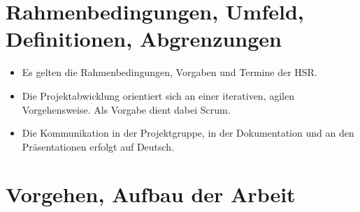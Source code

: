 \section{Rahmenbedingungen, Umfeld, Definitionen, Abgrenzungen}
\begin{itemize}
\item Es gelten die Rahmenbedingungen, Vorgaben und Termine der HSR.
\item Die Projektabwicklung orientiert sich an einer iterativen, agilen Vorgehensweise. Als Vorgabe dient dabei Scrum.
\item Die Kommunikation in der Projektgruppe, in der Dokumentation und an den Präsentationen erfolgt auf Deutsch.
\end{itemize}


\section{Vorgehen, Aufbau der Arbeit}

